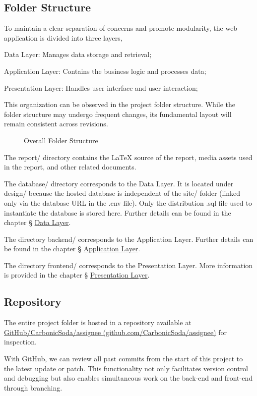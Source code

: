 \documentclass[12pt]{report}
\newcommand{\n}{\par}
\newcommand{\br}{\n\vspace{1 em}\n}
\begin{document}
\subsection{Folder Structure} \label{overview.project-structure.folder-structure}
To maintain a clear separation of concerns and promote modularity, the web application is divided into three layers,\n
Data Layer: Manages data storage and retrieval;\n
Application Layer: Contains the business logic and processes data;\n
Presentation Layer: Handles user interface and user interaction;
\br
This organization can be observed in the project folder structure.
While the folder structure may undergo frequent changes, its fundamental layout will remain consistent across revisions.
\newpage
\begin{figure}[h!]
	\centering
	\begin{minipage}{0.3\linewidth}
	\end{minipage}
	\caption{Overall Folder Structure}
	\label{fig:overview-folder-structure}
\end{figure}
The report/ directory contains the \LaTeX{} source of the report, media assets used in the report, and other related documents.
\br
The database/ directory corresponds to the Data Layer.
It is located under design/ because the hosted database is independent of the site/ folder (linked only via the database URL in the .env file).
Only the distribution .sql file used to instantiate the database is stored here.
Further details can be found in the chapter \S{} \hyperref[data-layer]{Data Layer}.
\br
The directory backend/ corresponds to the Application Layer.
Further details can be found in the chapter \S{} \hyperref[application-layer]{Application Layer}.
\br
The directory frontend/ corresponds to the Presentation Layer.
More information is provided in the chapter \S{} \hyperref[presentation-layer]{Presentation Layer}.


\subsection{Repository} \label{overview.project-structure.repository}
The entire project folder is hosted in a repository available at
\href{https://github.com/CarbonicSoda/assignee}{GitHub/Carbonic\-Soda/assignee (github.com/CarbonicSoda/assignee)} for inspection.
\br
With GitHub, we can review all past commits from the start of this project to the latest update or patch.
This functionality not only facilitates version control and debugging but also enables simultaneous work on the back-end and front-end through branching.
\end{document}
